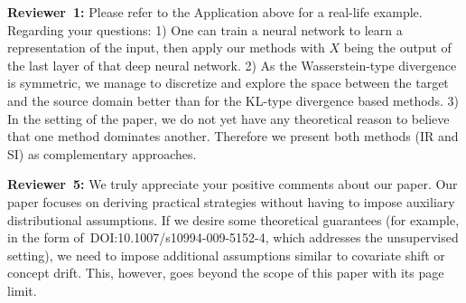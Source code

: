 \documentclass{article}
\begin{document}
{\bf Reviewer~1:} Please refer to the Application above for a real-life example. Regarding your questions:
1) One can train a neural network to learn a representation of the input, then apply our methods with $X$ being the output of the last layer of that deep neural network.
2) As the Wasserstein-type divergence is symmetric, we manage to discretize and explore the space between the target and the source domain better than for the KL-type divergence based methods. 
3) In the setting of the paper, we do not yet have any theoretical reason to believe that one method dominates another. Therefore we present both methods (IR and SI) as complementary approaches. 
\vspace{-.1cm}

{\bf Reviewer~5:}
We truly appreciate your positive comments about our paper.
Our paper focuses on deriving practical strategies without having to impose auxiliary distributional assumptions. If we desire some theoretical guarantees (for example, in the form of~DOI:10.1007/s10994-009-5152-4,  which addresses the unsupervised setting), we need to impose additional assumptions {similar to} covariate shift or concept drift. This, however, goes beyond the scope of this paper with its page limit.

\end{document}

